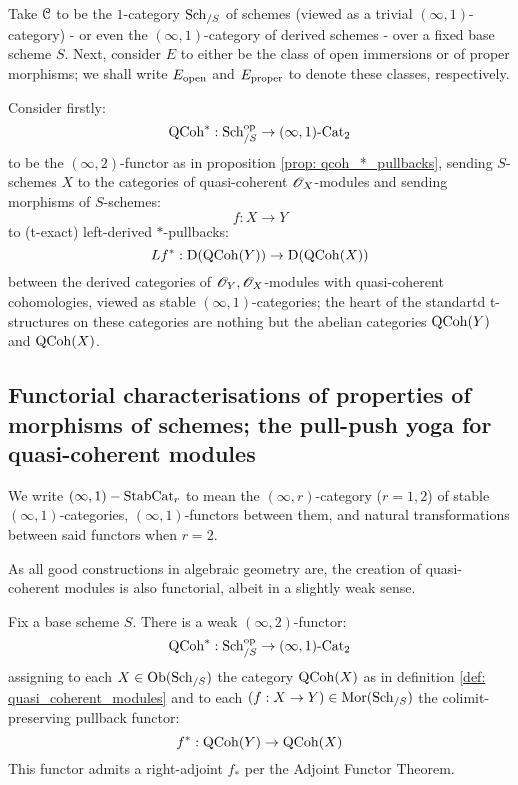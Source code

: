             \begin{example}
                Take $\mathcal{C}$ to be the $1$-category $\mathrm{Sch}_{/S}$ of schemes (viewed as a trivial $(\infty, 1)$-category) - or even the $(\infty, 1)$-category of derived schemes - over a fixed base scheme $S$. Next, consider $E$ to either be the class of open immersions or of proper morphisms; we shall write $E_{\mathrm{open}}$ and $E_{\mathrm{proper}}$ to denote these classes, respectively.

                Consider firstly:
                    $$\mathrm{QCoh}^*: \mathrm{Sch}_{/S}^{\mathrm{op}} \to (\infty, 1)\text{-}\mathrm{Cat}_2$$
                to be the $(\infty, 2)$-functor as in proposition \ref{prop: qcoh_*_pullbacks}, sending $S$-schemes $X$ to the categories of quasi-coherent $\mathscr{O}_X$-modules and sending morphisms of $S$-schemes:
                    $$f: X \to Y$$
                to (t-exact) left-derived $*$-pullbacks:
                    $$Lf^*: \mathrm{D}(\mathrm{QCoh}(Y)) \to \mathrm{D}(\mathrm{QCoh}(X))$$
                between the derived categories of $\mathscr{O}_Y, \mathscr{O}_X$-modules with quasi-coherent cohomologies, viewed as stable $(\infty, 1)$-categories; the heart of the standartd t-structures on these categories are nothing but the abelian categories $\mathrm{QCoh}(Y)$ and $\mathrm{QCoh}(X)$. 
            \end{example}

        \subsection{Functorial characterisations of properties of morphisms of schemes; the pull-push yoga for quasi-coherent modules}
            \begin{convention}
                We write $(\infty, 1)-\mathrm{Stab}\mathrm{Cat}_r$ to mean the $(\infty, r)$-category ($r = 1, 2$) of stable $(\infty, 1)$-categories, $(\infty, 1)$-functors between them, and natural transformations between said functors when $r = 2$.
            \end{convention}
        
            As all good constructions in algebraic geometry are, the creation of quasi-coherent modules is also functorial, albeit in a slightly weak sense. 
            \begin{proposition} \label{prop: qcoh_*_pullbacks}
                Fix a base scheme $S$. There is a weak $(\infty, 2)$-functor:
                    $$\mathrm{QCoh}^*: \mathrm{Sch}_{/S}^{\mathrm{op}} \to (\infty, 1)\text{-}\mathrm{Cat}_2$$
                assigning to each $X \in \mathrm{Ob}(\mathrm{Sch}_{/S})$ the category $\mathrm{QCoh}(X)$ as in definition \ref{def: quasi_coherent_modules} and to each $(f: X \to Y) \in \mathrm{Mor}(\mathrm{Sch}_{/S})$ the colimit-preserving pullback functor:
                    $$f^*: \mathrm{QCoh}(Y) \to \mathrm{QCoh}(X)$$
                This functor admits a right-adjoint $f_*$ per the Adjoint Functor Theorem. 
            \end{proposition}

